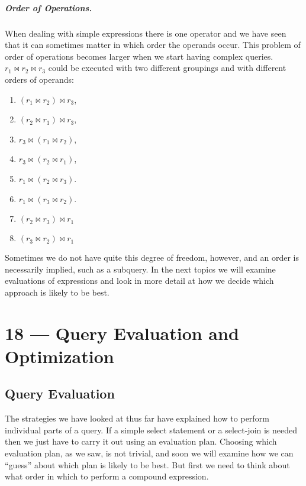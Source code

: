 \documentclass[a4paper]{report}
\begin{document}
\paragraph{Order of Operations.} When dealing with simple expressions there is one operator and we have seen that it can sometimes matter in which order the operands occur. This problem of order of operations becomes larger when we start having complex queries. $r_{1} \bowtie r_{2} \bowtie r_{3}$ could be executed with two different groupings and with different orders of operands: 
\begin{enumerate}
\item $(r_{1} \bowtie r_{2}) \bowtie r_{3}$,  
\item $(r_{2} \bowtie r_{1}) \bowtie r_{3}$, 
\item $r_{3} \bowtie (r_{1} \bowtie r_{2})$,
\item $r_{3} \bowtie (r_{2} \bowtie r_{1})$,
\item $r_{1} \bowtie (r_{2} \bowtie r_{3})$. 
\item $r_{1} \bowtie (r_{3} \bowtie r_{2})$. 
\item $(r_{2} \bowtie r_{3}) \bowtie r_{1}$
\item $(r_{3} \bowtie r_{2}) \bowtie r_{1}$
\end{enumerate}

Sometimes we do not have quite this degree of freedom, however, and an order is necessarily implied, such as a subquery. In the next topics we will examine evaluations of expressions and look in more detail at how we decide which approach is likely to be best.









\chapter*{18 --- Query Evaluation and Optimization}


\section*{Query Evaluation}

The strategies we have looked at thus far have explained how to perform individual parts of a query. If a simple select statement or a select-join is needed then we just have to carry it out using an evaluation plan. Choosing which evaluation plan, as we saw, is not trivial, and soon we will examine how we can ``guess'' about which plan is likely to be best. But first we need to think about what order in which to perform a compound expression.
\end{document}
